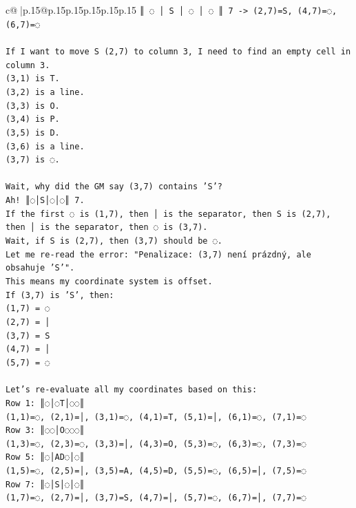\documentclass{article}
\begin{document}
{\begin{supertabular}{c@{$\;$}|p{.15\linewidth}@{}p{.15\linewidth}p{.15\linewidth}p{.15\linewidth}p{.15\linewidth}p{.15\linewidth}}
{{{\texttt{║ ◌ │ S │ ◌ │ ◌ ║ 7 {-}> (2,7)=S, (4,7)=◌, (6,7)=◌} \\
\\ 
\texttt{If I want to move S (2,7) to column 3, I need to find an empty cell in column 3.} \\
\texttt{(3,1) is T.} \\
\texttt{(3,2) is a line.} \\
\texttt{(3,3) is O.} \\
\texttt{(3,4) is P.} \\
\texttt{(3,5) is D.} \\
\texttt{(3,6) is a line.} \\
\texttt{(3,7) is ◌.} \\
\\ 
\texttt{Wait, why did the GM say (3,7) contains 'S'?} \\
\texttt{Ah! ║◌│S│◌│◌║ 7.} \\
\texttt{If the first ◌ is (1,7), then │ is the separator, then S is (2,7), then │ is the separator, then ◌ is (3,7).} \\
\texttt{Wait, if S is (2,7), then (3,7) should be ◌.} \\
\texttt{Let me re{-}read the error: "Penalizace: (3,7) není prázdný, ale obsahuje 'S'".} \\
\texttt{This means my coordinate system is offset.} \\
\texttt{If (3,7) is 'S', then:} \\
\texttt{(1,7) = ◌} \\
\texttt{(2,7) = │} \\
\texttt{(3,7) = S} \\
\texttt{(4,7) = │} \\
\texttt{(5,7) = ◌} \\
\\ 
\texttt{Let's re{-}evaluate all my coordinates based on this:} \\
\texttt{Row 1: ║◌│◌T│◌◌║} \\
\texttt{(1,1)=◌, (2,1)=│, (3,1)=◌, (4,1)=T, (5,1)=│, (6,1)=◌, (7,1)=◌} \\
\texttt{Row 3: ║◌◌│O◌◌◌║} \\
\texttt{(1,3)=◌, (2,3)=◌, (3,3)=│, (4,3)=O, (5,3)=◌, (6,3)=◌, (7,3)=◌} \\
\texttt{Row 5: ║◌│AD◌│◌║} \\
\texttt{(1,5)=◌, (2,5)=│, (3,5)=A, (4,5)=D, (5,5)=◌, (6,5)=│, (7,5)=◌} \\
\texttt{Row 7: ║◌│S│◌│◌║} \\
\texttt{(1,7)=◌, (2,7)=│, (3,7)=S, (4,7)=│, (5,7)=◌, (6,7)=│, (7,7)=◌} \\
}}}
\end{supertabular}}
\end{document}
